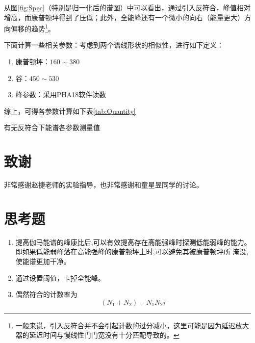 \documentclass{article}
\begin{document}
    从图\ref{fig:Spec}（特别是归一化后的谱图）中可以看出，通过引入反符合，峰值相对增高，而康普顿坪得到了压低；此外，全能峰还有一个微小的向右（能量更大）方向偏移的趋势\footnote{一般来说，引入反符合并不会引起计数的过分减小，这里可能是因为延迟放大器的延迟时间与慢线性门门宽没有十分匹配导致的。}。

下面计算一些相关参数：考虑到两个谱线形状的相似性，进行如下定义：
\begin{enumerate}
    \item 康普顿坪：$160\sim 380$
    \item 谷：$450\sim 530$
    \item 峰参数：采用PHA18软件读数
\end{enumerate}
综上，可得各参数计算如下表\ref{tab:Quantity}
\begin{table}[htbp]
    \centering
    \caption{有无反符合下能谱各参数测量值\label{tab:Quantity}}
    
\end{table}

\section{致谢}
    非常感谢赵捷老师的实验指导，也非常感谢和童星昱同学的讨论。
    \clearpage
    \appendix
    \appendixpage
    \section{思考题}
    \begin{enumerate}
        \item 提高伽马能谱的峰康比后,可以有效提高存在高能强峰时探测低能弱峰的能力。即如果低能弱峰落在高能强峰的康普顿坪上时,可以避免其被康普顿坪所
        淹没,使能谱更加干净。
        \item 通过设置阈值，卡掉全能峰。
        \item 偶然符合的计数率为
        \begin{equation}
            (N_1+N_2)-N_1N_2\tau
        \end{equation}
    \end{enumerate}
\end{document}
